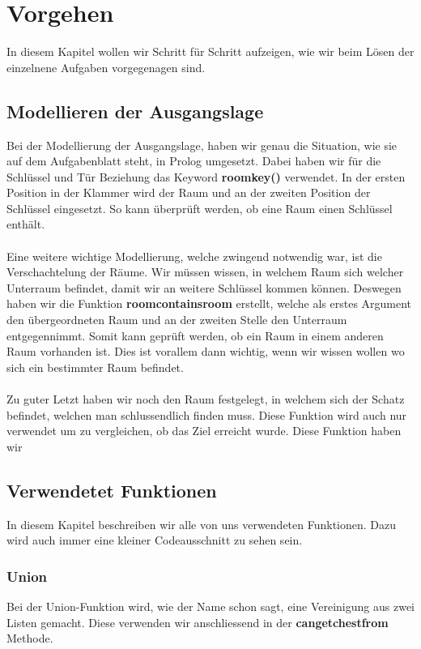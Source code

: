 \chapter{Vorgehen}
In diesem Kapitel wollen wir Schritt für Schritt
aufzeigen, wie wir beim Lösen der einzelnene
Aufgaben vorgegenagen sind.

\section{Modellieren der Ausgangslage}
Bei der Modellierung der Ausgangslage, haben wir genau
die Situation, wie sie auf dem Aufgabenblatt steht,
in Prolog umgesetzt. Dabei haben wir für die 
Schlüssel und Tür Beziehung das Keyword
\textbf{roomkey()} verwendet. In der 
ersten Position in der Klammer wird der Raum und an der
zweiten Position der Schlüssel eingesetzt. So kann überprüft 
werden, ob eine Raum einen Schlüssel enthält.\\
\\

\noindent
Eine weitere wichtige Modellierung, welche zwingend notwendig
war, ist die Verschachtelung der Räume. Wir müssen wissen,
in welchem Raum sich welcher Unterraum befindet, damit wir an 
weitere Schlüssel kommen können. Deswegen haben wir die 
Funktion \textbf{roomcontainsroom} erstellt, welche als erstes
Argument den übergeordneten Raum und an der zweiten Stelle
den Unterraum entgegennimmt. Somit kann geprüft werden, ob ein Raum in einem 
anderen Raum vorhanden ist. Dies ist vorallem dann wichtig, wenn
wir wissen wollen wo sich ein bestimmter Raum befindet.\\
\\

\noindent
Zu guter Letzt haben wir noch den Raum festgelegt, in welchem sich 
der Schatz befindet, welchen man schlussendlich finden muss. Diese
Funktion wird auch nur verwendet um zu vergleichen, ob das Ziel 
erreicht wurde. Diese Funktion haben wir \textbf{}

\section{Verwendetet Funktionen}
In diesem Kapitel beschreiben wir alle von uns verwendeten Funktionen.
Dazu wird auch immer eine kleiner Codeausschnitt zu sehen sein.

\subsection{Union}
Bei der Union-Funktion wird, wie der Name schon sagt, eine Vereinigung
aus zwei Listen gemacht. Diese verwenden wir anschliessend in der 
\textbf{cangetchestfrom} Methode.

